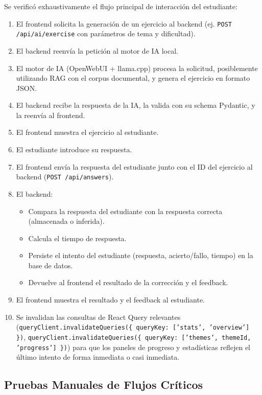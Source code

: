 Se verificó exhaustivamente el flujo principal de interacción del estudiante:
\begin{enumerate}[leftmargin=*]
  \item El frontend solicita la generación de un ejercicio al backend (ej. \texttt{POST /api/ai/exercise} con parámetros de tema y dificultad).
  \item El backend reenvía la petición al motor de IA local.
  \item El motor de IA (OpenWebUI + llama.cpp) procesa la solicitud, posiblemente utilizando RAG con el corpus documental, y genera el ejercicio en formato JSON.
  \item El backend recibe la respuesta de la IA, la valida con su schema Pydantic, y la reenvía al frontend.
  \item El frontend muestra el ejercicio al estudiante.
  \item El estudiante introduce su respuesta.
  \item El frontend envía la respuesta del estudiante junto con el ID del ejercicio al backend (\texttt{POST /api/answers}).
  \item El backend:
        \begin{itemize}
            \item Compara la respuesta del estudiante con la respuesta correcta (almacenada o inferida).
            \item Calcula el tiempo de respuesta.
            \item Persiste el intento del estudiante (respuesta, acierto/fallo, tiempo) en la base de datos.
            \item Devuelve al frontend el resultado de la corrección y el feedback.
        \end{itemize}
  \item El frontend muestra el resultado y el feedback al estudiante.
  \item Se invalidan las consultas de React Query relevantes (\texttt{queryClient.invalidateQueries(\{ queryKey: ['stats', 'overview'] \})}, \texttt{queryClient.invalidateQueries(\{ queryKey: ['themes', themeId, 'progress'] \})}) para que los paneles de progreso y estadísticas reflejen el último intento de forma inmediata o casi inmediata.
\end{enumerate}

\subsection{Pruebas Manuales de Flujos Críticos}
\label{ssec:desarrollo_iter5_manual_tests}


